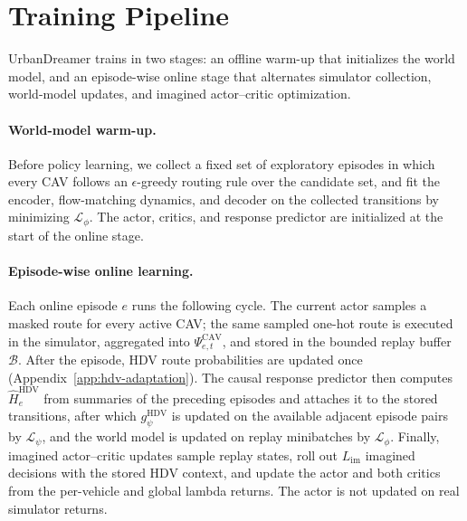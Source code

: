 \section{Training Pipeline}
\label{app:training-pipeline}

UrbanDreamer trains in two stages: an offline warm-up that initializes the
world model, and an episode-wise online stage that alternates simulator
collection, world-model updates, and imagined actor--critic optimization.

\paragraph{World-model warm-up.}
Before policy learning, we collect a fixed set of exploratory episodes in
which every CAV follows an \(\epsilon\)-greedy routing rule over the candidate
set, and fit the encoder, flow-matching dynamics, and decoder on the collected
transitions by minimizing \(\mathcal{L}_\phi\).  The actor, critics, and
response predictor are initialized at the start of the online stage.

\paragraph{Episode-wise online learning.}
Each online episode \(e\) runs the following cycle.  The current actor samples
a masked route for every active CAV; the same sampled one-hot route is
executed in the simulator, aggregated into \(\Psi_{e,t}^{\mathrm{CAV}}\), and
stored in the bounded replay buffer \(\mathcal{B}\).  After the episode, HDV
route probabilities are updated once
(Appendix~\ref{app:hdv-adaptation}).  The causal
response predictor then computes \(\hat H_e^{\mathrm{HDV}}\) from summaries of
the preceding episodes and attaches it to the stored transitions, after which
\(g_\psi^{\mathrm{HDV}}\) is updated on the available adjacent episode pairs by
\(\mathcal{L}_\psi\), and the world model is updated on replay minibatches by
\(\mathcal{L}_\phi\).  Finally, imagined actor--critic updates sample replay
states, roll out \(L_{\mathrm{im}}\) imagined decisions with the stored HDV
context, and update the actor and both critics from the per-vehicle and global
lambda returns.  The actor is not updated on real simulator returns.

